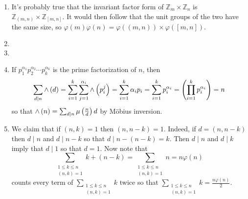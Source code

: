 \documentclass[12pt]{article}
\let\ln\relax\DeclareMathOperator{\ln}{\mathsf{ln}}
\begin{document}
\begin{enumerate}
\item %
It's probably true that
the invariant factor form of $\mathbb{Z}_m\times
\mathbb{Z}_n$ is
$\mathbb{Z}_{\left(m,n\right)}\times
\mathbb{Z}_{\left[m,n\right]}$.
It would then follow that the unit groups of the two
have the same size, so $\varphi\left(m\right)\varphi\left(n\right)
=\varphi\left(\left(m,n\right)\right)\times\varphi\left(
\left[m,n\right]\right)$.

\item %
\item %

\item %
If $p_1^{\alpha_1}p_2^{\alpha_2}\cdots p_k^{\alpha_k}$
is the prime factorization of $n$, then
\[\sum_{d\mid n}\wedge\left(d\right)
=\sum_{i=1}^{k}\sum_{j=1}^{\alpha_i}\wedge\left(p_i^j\right)
=\sum_{i=1}^{k}\alpha_i\ln{p_i}
=\sum_{i=1}^{k}\ln{p_i^{\alpha_i}}
=\ln\left(\prod_{i=1}^{k}p_i^{\alpha_i}\right)
=\ln{n}\]
so that $\wedge\left(n\right)=\sum_{d\mid n}\mu\left(\frac{n}{d}\right)
\ln{d}$ by M\"obius inversion.

\item %
We claim that if $\left(n,k\right)=1$ then $\left(n,n-k\right)=1$.
Indeed, if $d=\left(n,n-k\right)$ then $d\mid n$ and $d\mid n-k$
so that $d\mid n-\left(n-k\right)=k$. Then $d\mid n$ and $d\mid k$
imply that $d\mid 1$ so that $d=1$. Now note that
\[\sum_{\substack{1\le k\le n\\\left(n,k\right)=1}}k+\left(n-k\right)
=\sum_{\substack{1\le k\le n\\\left(n,k\right)=1}}n=n\varphi\left(n\right)\]
counts every term of
$\sum_{\substack{1\le k\le n\\\left(n,k\right)=1}}k$ twice so that
$\sum_{\substack{1\le k\le n\\\left(n,k\right)=1}}k
=\frac{n\varphi\left(n\right)}{2}$.

\end{enumerate}
\end{document}
